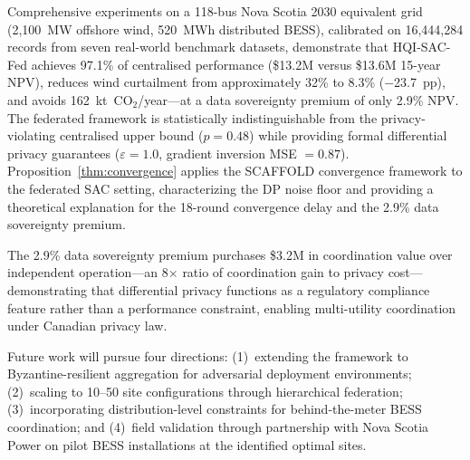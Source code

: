 \documentclass[journal]{IEEEtran}
\begin{document}
Comprehensive experiments on a 118-bus Nova Scotia 2030 equivalent
grid (2,100~MW offshore wind, 520~MWh distributed BESS), calibrated
on 16,444,284 records from seven real-world benchmark datasets,
demonstrate that HQI-SAC-Fed achieves 97.1\% of centralised
performance (\$13.2M versus \$13.6M 15-year NPV), reduces wind
curtailment from approximately 32\% to 8.3\% ($-$23.7~pp), and avoids
162~kt~CO$_2$/year---at a data sovereignty premium of only 2.9\% NPV.
The federated framework is statistically indistinguishable from the
privacy-violating centralised upper bound ($p = 0.48$) while providing
formal differential privacy guarantees ($\varepsilon = 1.0$, gradient
inversion MSE $= 0.87$). Proposition~\ref{thm:convergence} applies the SCAFFOLD convergence
framework to the federated SAC setting, characterizing the DP noise
floor and providing a theoretical explanation for the 18-round
convergence delay and the 2.9\% data sovereignty premium.

The 2.9\% data sovereignty premium purchases \$3.2M in coordination
value over independent operation---an 8$\times$ ratio of coordination
gain to privacy cost---demonstrating that differential privacy
functions as a regulatory compliance feature rather than a performance
constraint, enabling multi-utility coordination under Canadian privacy
law.

Future work will pursue four directions: (1)~extending the framework
to Byzantine-resilient aggregation for adversarial deployment
environments; (2)~scaling to 10--50 site configurations through
hierarchical federation; (3)~incorporating distribution-level
constraints for behind-the-meter BESS coordination; and (4)~field
validation through partnership with Nova Scotia Power on pilot BESS
installations at the identified optimal sites.
\end{document}
